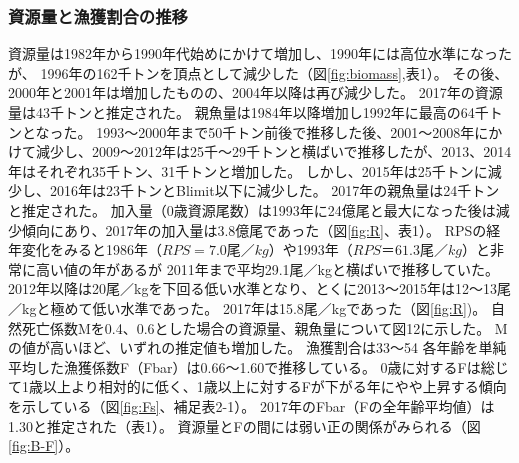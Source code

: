 \subsubsection{資源量と漁獲割合の推移}
資源量は1982年から1990年代始めにかけて増加し、1990年には高位水準になったが、
1996年の162千トンを頂点として減少した（図\ref{fig:biomass},表1）。
その後、2000年と2001年は増加したものの、2004年以降は再び減少した。
2017年の資源量は43千トンと推定された。
親魚量は1984年以降増加し1992年に最高の64千トンとなった。
1993～2000年まで50千トン前後で推移した後、2001～2008年にかけて減少し、2009～2012年は25千～29千トンと横ばいで推移したが、2013、2014年はそれぞれ35千トン、31千トンと増加した。
しかし、2015年は25千トンに減少し、2016年は23千トンとBlimit以下に減少した。
2017年の親魚量は24千トンと推定された。
加入量（0歳資源尾数）は1993年に24億尾と最大になった後は減少傾向にあり、2017年の加入量は3.8億尾であった（図\ref{fig:R}、表1）。
RPSの経年変化をみると1986年（$RPS = 7.0尾／kg$）や1993年（$RPS ＝ 61.3尾／kg$）と非常に高い値の年があるが
2011年まで平均29.1尾／kgと横ばいで推移していた。
2012年以降は20尾／kgを下回る低い水準となり、とくに2013～2015年は12～13尾／kgと極めて低い水準であった。
2017年は15.8尾／kgであった（図\ref{fig:R})。
自然死亡係数Mを0.4、0.6とした場合の資源量、親魚量について図12に示した。
Mの値が高いほど、いずれの推定値も増加した。
漁獲割合は33～54%
各年齢を単純平均した漁獲係数F（Fbar）は0.66～1.60で推移している。
0歳に対するFは総じて1歳以上より相対的に低く、1歳以上に対するFが下がる年にやや上昇する傾向を示している（図\ref{fig:Fs}、補足表2-1）。
2017年のFbar（Fの全年齢平均値）は1.30と推定された（表1）。
資源量とFの間には弱い正の関係がみられる（図\ref{fig:B-F}）。

